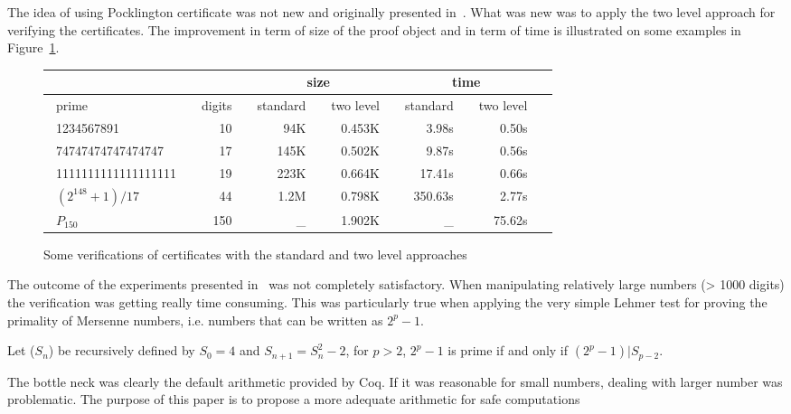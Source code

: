 The idea of using Pocklington certificate was not new and originally presented 
in~\cite{Caprotti_Oostdijk:01pockjsc}.
What was new was to apply the two level approach for verifying the
certificates. The improvement in term of size of the
proof object and in term of time is illustrated on some examples in
Figure~\ref{fig:TimeComp}.
\begin{figure}
\begin{center}
\begin{tabular}{|l|r|r|r|r|r|r|}
\cline{3-6}
\multicolumn{2}{c}{} & \multicolumn{2}{|c|}{size} &
                                               \multicolumn{2}{c|}{time} \\
\hline
~prime     ~     & \multicolumn{1}{c|}{~digits~ } & ~standard~  &
  \multicolumn{1}{c|}{ ~two level~ } &
  \multicolumn{1}{c|}{ ~standard~ } &
  \multicolumn{1}{c|}{ ~two level~ } \\
\hline
~1234567891       ~   & 10~ &  94K~ &  ~0.453K~ & 3.98s~  & 0.50s~  \\
~74747474747474747~   & 17~ & 145K~ &  0.502K~ &   9.87s~ & 0.56s~ \\
~1111111111111111111~ & 19~ & 223K~ &  0.664K~ & 17.41s~  & 0.66s~   \\
~$(2^{148}+1)/17$ ~   & 44~ & 1.2M~ & 0.798K~ & ~350.63s~  & 2.77s~   \\
~$P_{150}$   ~        &150~ &  \_~  & 1.902K~   &  \_~   & 75.62s~  \\
\hline
\end{tabular}
\end{center}
\caption{Some verifications of certificates with the standard and two level approaches}
\label{fig:TimeComp}
\end{figure} 
The outcome of the experiments presented in~\cite{GreTheWer} was not completely
satisfactory. When manipulating  relatively large numbers (> 1000 digits) the 
verification was getting really time consuming. This was particularly true when applying the very simple Lehmer test
for proving the primality of Mersenne numbers, i.e. numbers that can be written as $2 ^ p -1$.
\begin{theorem}\label{lucas}
Let ($S_n$) be recursively defined by $S_0= 4$ and $S_{n+1} = S_n^2 - 2$,
for $p > 2$, $2^p-1$ is prime if and only if $(2^p -1) | S_{p-2}$.
\end{theorem}
The bottle neck was clearly the default arithmetic provided by {\sc Coq}. If it was 
reasonable for small numbers, dealing with larger number was problematic.
The purpose of this paper is to propose a more adequate arithmetic for safe computations

